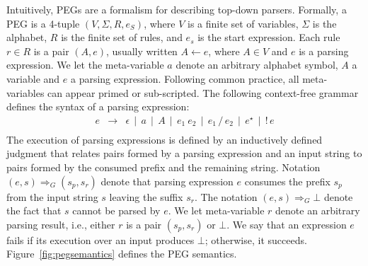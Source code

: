 \documentclass[10pt,sigplan,screen,review,anonymous]{acmart}
\begin{document}
Intuitively, PEGs are a formalism for describing top-down parsers.
Formally, a PEG is a 4-tuple $(V,\Sigma,R,e_S)$, where $V$ is a 
finite set of variables, $\Sigma$ is the alphabet, $R$ is the finite 
set of rules, and $e_s$ is the start expression. Each rule $r \in R$ is a 
pair $(A,e)$, usually written $A \leftarrow e$, where $A \in V$ and $e$ 
is a parsing expression. We let the meta-variable $a$ denote an 
arbitrary alphabet symbol, $A$ a variable and $e$ a parsing expression. 
Following common practice, all meta-variables can appear primed or 
sub-scripted. The following context-free grammar defines
the syntax of a parsing expression:
\[
\begin{array}{lcl}
e & \to  & \epsilon \,\mid\, a \,\mid\, A\,\mid\,e_1\:e_2\,
\mid\,e_1\,/\,e_2\,\mid\,e^\star\,\mid\,!\,e\\
\end{array}
\]
The execution of parsing expressions is defined by an inductively defined
judgment that relates pairs formed by a parsing expression and an input string
to pairs formed by the consumed prefix and the remaining string.
Notation $(e,s) \Rightarrow_G (s_p,s_r)$ denote that parsing expression $e$
consumes the prefix $s_p$ from the input string $s$ leaving the suffix $s_r$.
The notation $(e,s) \Rightarrow_G \bot$ denote the fact that $s$ cannot be parsed by
$e$. We let meta-variable $r$ denote an arbitrary parsing result, i.e.,
either $r$ is a pair $(s_p,s_r)$ or $\bot$. We say that an expression $e$
fails if its execution over an input produces $\bot$; otherwise, it succeeds.
Figure~\ref{fig:pegsemantics} defines the PEG semantics.
\end{document}
